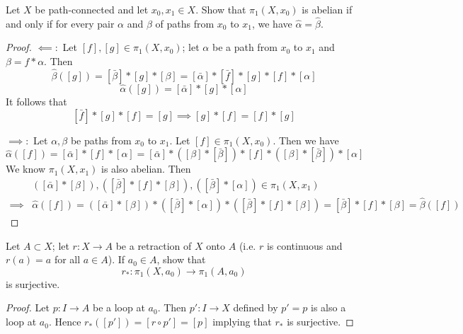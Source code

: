 \documentclass[12pt,a4paper]{article}
\begin{document}
    \begin{ex}
        Let $X$ be path-connected and let $x_0,x_1\in X$. Show that $\pi_1(X,x_0)$ is abelian if and only if for every pair $\alpha$ and $\beta$ of paths from $x_0$ to $x_1$, we have $\hat{\alpha}=\hat{\beta}$.
    \end{ex}
    \begin{proof}
        $\impliedby:$ Let $[f],[g]\in\pi_1(X,x_0)$; let $\alpha$ be a path from $x_0$ to $x_1$ and $\beta=f*\alpha$. Then
        \[
            \hat{\beta}([g])=[\bar{\beta}]*[g]*[\beta]=[\bar{\alpha}]*[\bar{f}]*[g]*[f]*[\alpha]
        \]
        \[
            \hat{\alpha}([g])=[\bar{\alpha}]*[g]*[\alpha]
        \]
        It follows that
        \[
            [\bar{f}]*[g]*[f]=[g]\implies [g]*[f]=[f]*[g]
        \]

        $\implies:$ Let $\alpha,\beta$ be paths from $x_0$ to $x_1$. Let $[f]\in\pi_1(X,x_0)$. Then we have
        \[
            \hat{\alpha}([f])=[\bar{\alpha}]*[f]*[\alpha]=[\bar{\alpha}]*([\beta]*[\bar{\beta}])*[f]*([\beta]*[\bar{\beta}])*[\alpha]
        \]
        We know $\pi_1(X,x_1)$ is also abelian. Then
        \begin{align*}
            &([\bar{\alpha}]*[\beta]),([\bar{\beta}]*[f]*[\beta]),([\bar{\beta}]*[\alpha])\in\pi_1(X,x_1)\\
            \implies&\hat{\alpha}([f])=([\bar{\alpha}]*[\beta])*([\bar{\beta}]*[\alpha])*([\bar{\beta}]*[f]*[\beta])=[\bar{\beta}]*[f]*[\beta]=\hat{\beta}([f])
        \end{align*}
    \end{proof}
    \bigskip

    \begin{ex}
        Let $A\subset X$; let $r:X\to A$ be a retraction of $X$ onto $A$ (i.e. $r$ is continuous and $r(a)=a$ for all $a\in A$). If $a_0\in A$, show that
        \[
            r_*:\pi_1(X,a_0)\to \pi_1(A,a_0)
        \]
        is surjective.
    \end{ex}
    \begin{proof}
        Let $p:I\to A$ be a loop at $a_0$. Then $p':I\to X$ defined by $p'=p$ is also a loop at $a_0$. Hence $r_*([p'])=[r\circ p']=[p]$ implying that $r_*$ is surjective.
    \end{proof}
    \bigskip
\end{document}
